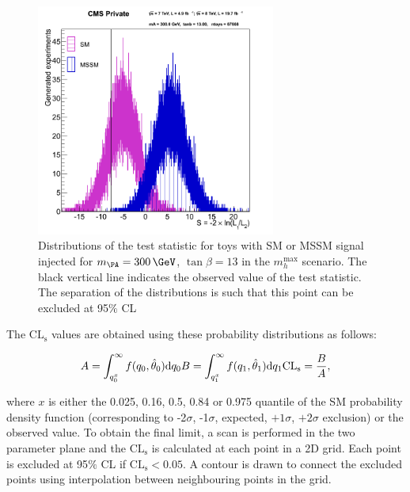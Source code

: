\begin{figure}[tbh]
\includegraphics[width=0.7\textwidth]{plots/htt-mssm/sigsep_13.png}
\caption[Distributions of the test statistic for toys with SM or MSSM
signal injected for $m_{\PA} = 300\,\GeV$, $\tan\beta = 13$ in the $m_{h}^{\text{max}}$
scenario.]{Distributions of the test statistic for toys with \ac{SM} or
\ac{MSSM} signal injected for $m_{\PA} = 300\,\GeV$, $\tan\beta = 13$ in the $m_{h}^{\text{max}}$
scenario. The black vertical line indicates the observed value of the test
statistic. The separation of the distributions is such that this point can be
excluded at 95$\%$ CL}
\label{fig:toydistribution}
\end{figure}

The $\mathrm{CL_{s}}$ values are obtained using these probability distributions as
follows:

\begin{equation}
A = \int_{q_{0}^{x}}^{\infty}f(q_{0},\hat{\theta}_{0})\mathrm{d}q_{0}\, \\
B = \int_{q_{1}^{x}}^{\infty}f(q_{1},\hat{\theta}_{1})\mathrm{d}q_{1}\, \\
\mathrm{CL_{s}} = \frac{B}{A},
\end{equation}

where $x$ is either the 0.025, 0.16, 0.5, 0.84 or 0.975 quantile of the SM
probability density function (corresponding to -2$\sigma$, -1$\sigma$, expected,
$+1\sigma$, $+2\sigma$ exclusion) or the observed value. To obtain the final limit, 
a scan is performed in the two parameter plane and
the $\mathrm{CL_{s}}$ is calculated at each point in a 2D grid. Each point is excluded at
95$\%$ CL if $\mathrm{CL_{s}}<0.05$. A contour is drawn to connect the excluded points
using interpolation between neighbouring points in the grid.

